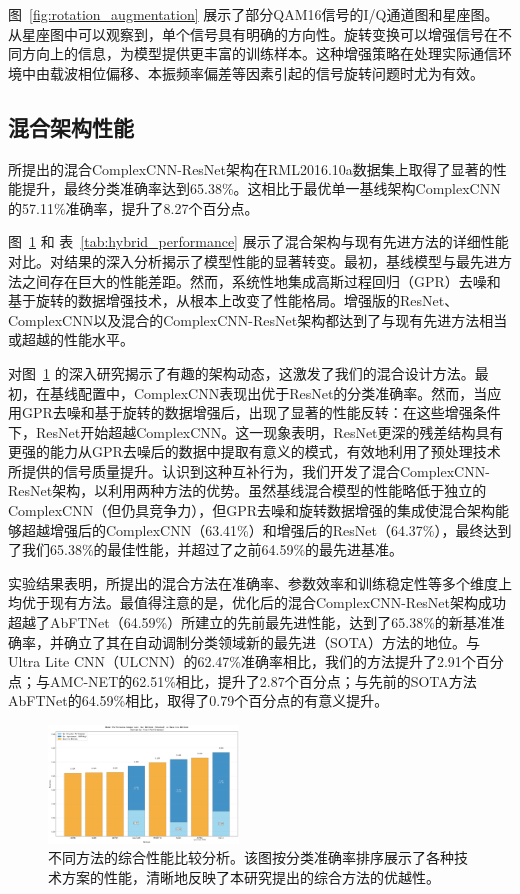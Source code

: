\documentclass{article}
\begin{document}
图~\ref{fig:rotation_augmentation} 展示了部分QAM16信号的I/Q通道图和星座图。从星座图中可以观察到，单个信号具有明确的方向性。旋转变换可以增强信号在不同方向上的信息，为模型提供更丰富的训练样本。这种增强策略在处理实际通信环境中由载波相位偏移、本振频率偏差等因素引起的信号旋转问题时尤为有效。

\subsection{混合架构性能}

所提出的混合ComplexCNN-ResNet架构在RML2016.10a数据集上取得了显著的性能提升，最终分类准确率达到65.38\%。这相比于最优单一基线架构ComplexCNN的57.11\%准确率，提升了8.27个百分点。

图~\ref{fig:method_comparison} 和 表~\ref{tab:hybrid_performance} 展示了混合架构与现有先进方法的详细性能对比。对结果的深入分析揭示了模型性能的显著转变。最初，基线模型与最先进方法之间存在巨大的性能差距。然而，系统性地集成高斯过程回归（GPR）去噪和基于旋转的数据增强技术，从根本上改变了性能格局。增强版的ResNet、ComplexCNN以及混合的ComplexCNN-ResNet架构都达到了与现有先进方法相当或超越的性能水平。

对图~\ref{fig:method_comparison} 的深入研究揭示了有趣的架构动态，这激发了我们的混合设计方法。最初，在基线配置中，ComplexCNN表现出优于ResNet的分类准确率。然而，当应用GPR去噪和基于旋转的数据增强后，出现了显著的性能反转：在这些增强条件下，ResNet开始超越ComplexCNN。这一现象表明，ResNet更深的残差结构具有更强的能力从GPR去噪后的数据中提取有意义的模式，有效地利用了预处理技术所提供的信号质量提升。认识到这种互补行为，我们开发了混合ComplexCNN-ResNet架构，以利用两种方法的优势。虽然基线混合模型的性能略低于独立的ComplexCNN（但仍具竞争力），但GPR去噪和旋转数据增强的集成使混合架构能够超越增强后的ComplexCNN（63.41\%）和增强后的ResNet（64.37\%），最终达到了我们65.38\%的最佳性能，并超过了之前64.59\%的最先进基准。

实验结果表明，所提出的混合方法在准确率、参数效率和训练稳定性等多个维度上均优于现有方法。最值得注意的是，优化后的混合ComplexCNN-ResNet架构成功超越了AbFTNet（64.59\%）所建立的先前最先进性能，达到了65.38\%的新基准准确率，并确立了其在自动调制分类领域新的最先进（SOTA）方法的地位。与Ultra Lite CNN（ULCNN）的62.47\%准确率相比，我们的方法提升了2.91个百分点；与AMC-NET的62.51\%相比，提升了2.87个百分点；与先前的SOTA方法AbFTNet的64.59\%相比，取得了0.79个百分点的有意义提升。

\begin{figure}[htbp]
\centering
\includegraphics[width=0.45\textwidth]{figure/sorted_stacked_comparison.png}
\caption{不同方法的综合性能比较分析。该图按分类准确率排序展示了各种技术方案的性能，清晰地反映了本研究提出的综合方法的优越性。}
\label{fig:method_comparison}
\end{figure}
\end{document}

